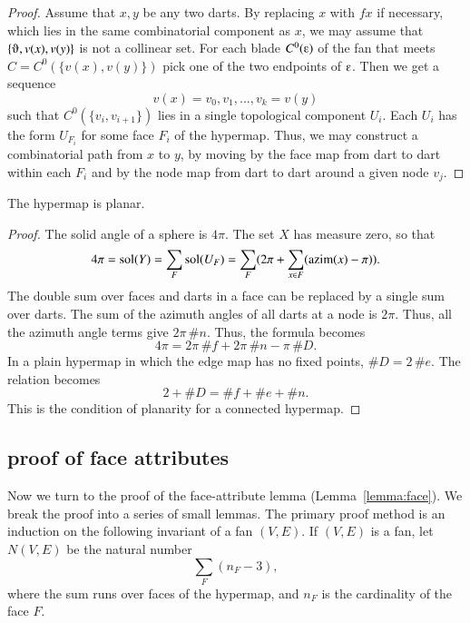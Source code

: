 \begin{proof} Assume that $x,y$ be any two darts.  By replacing $x$ with $f x$ if necessary, which lies in the same combinatorial component as $x$, we may
assume that $\{\orgn,v(x),v(y)\}$ is not a collinear set. 
For each blade $C^0(\e)$ of the fan that meets $C=C^0(\{v(x),v(y)\})$
pick one of the two endpoints of $\e$.  Then we get a sequence
$$
v(x)=v_0,v_1,\ldots,v_k=v(y)
$$
such that $C^0(\{v_i,v_{i+1}\})$ lies in a single topological component $U_i$.  Each $U_i$ has the form $U_{F_i}$ for some face $F_i$ of the hypermap.
Thus, we may construct a combinatorial path from $x$ to $y$, by moving by the face map from dart to dart within each $F_i$ and by the node map from dart to dart around a given node $v_j$.
\end{proof}

\begin{corollary}  
The hypermap is planar.
\end{corollary}

\begin{proof}  The solid angle of a sphere is $4\pi$.  The set $X$
has measure zero, so that
$$
4\pi = \operatorname{sol}(Y)= \sum_F \operatorname{sol}(U_F) = 
\sum_F ( 2\pi + \sum_{x\in F} ({\operatorname{azim}}(x)-\pi) ).
$$
The double sum over faces and darts in a face can be replaced by
a single sum over darts.  
The sum of the azimuth angles of all darts at a node is $2\pi$. Thus,
all the azimuth angle terms give $2\pi\,\#n$.
Thus, the formula becomes
$$
4\pi = 2\pi\, \#f +2\pi\,\#n - \pi\, \#D.
$$
In a plain hypermap in which the edge map has no fixed points, $\#D = 2\,\#e$.
The relation becomes
$$
2 + \#D = \#f + \#e + \#n.
$$
This is the condition of planarity for a connected hypermap.
\end{proof}

\subsection{proof of face attributes}

Now we turn to the proof of the face-attribute lemma (Lemma~\ref{lemma:face}).  We break the proof into a series of small lemmas.  The primary proof method is an induction on the following invariant of a fan $(V,E)$.  If $(V,E)$ is a fan,  let $N(V,E)$ be the natural number
$$
\sum_F (n_F - 3),
$$
where the sum runs over faces of the  hypermap, and $n_F$ is the cardinality of the face $F$.

